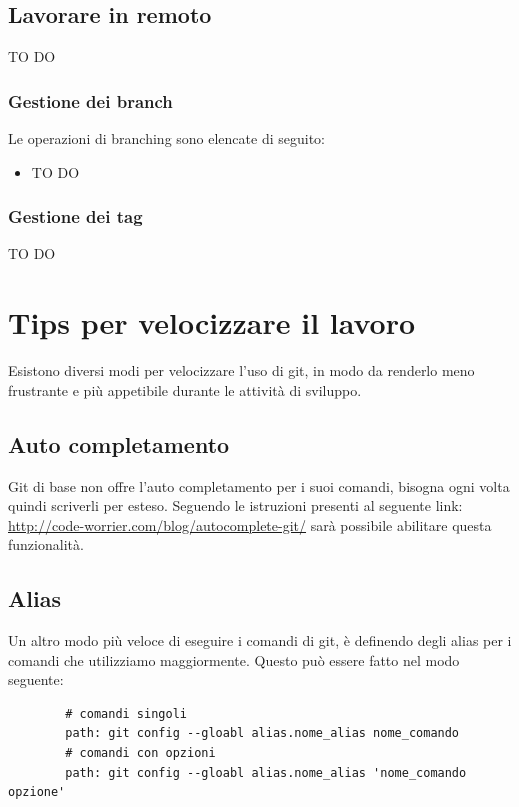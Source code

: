 	
	\subsection{Lavorare in remoto} %
	\label{sub:lavorare_in_remoto}
	TO DO
		\subsubsection{Gestione dei branch} %
		\label{ssub:gestione_dei_branch_remoto}
		Le operazioni di branching sono elencate di seguito:
			\begin{itemize}
				\item TO DO
			\end{itemize}

		\subsubsection{Gestione dei tag} %
		\label{ssub:gestione_dei_tag_remoto}
		TO DO



\newpage \clearpage
\section{Tips per velocizzare il lavoro} %
\label{sec:tips_per_velocizzare_il_lavoro}
Esistono diversi modi per velocizzare l'uso di git, in modo da renderlo meno frustrante e più appetibile durante le attività di sviluppo.
	\subsection{Auto completamento} %
	\label{sub:auto_completamento}
	Git di base non offre l'auto completamento per i suoi comandi, bisogna ogni volta quindi scriverli per esteso. Seguendo le istruzioni presenti al seguente link: \url{http://code-worrier.com/blog/autocomplete-git/} sarà possibile abilitare questa funzionalità.
	
	\subsection{Alias} %
	\label{sub:alias}
	Un altro modo più veloce di eseguire i comandi di git, è definendo degli alias per i comandi che utilizziamo maggiormente. Questo può essere fatto nel modo seguente:
	\begin{verbatim}
		# comandi singoli
		path: git config --gloabl alias.nome_alias nome_comando
		# comandi con opzioni
		path: git config --gloabl alias.nome_alias 'nome_comando opzione'
	\end{verbatim}

